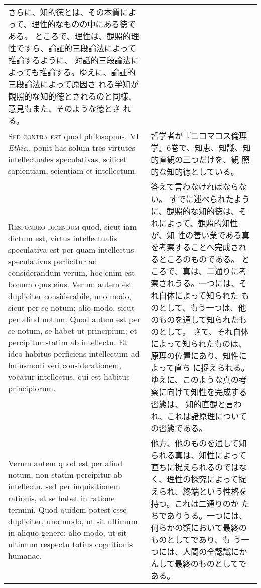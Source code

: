 \documentclass[10pt]{jsarticle} %
\begin{document}
\begin{longtable}{p{21em}p{21em}}
さらに、知的徳とは、その本質によって、理性的なものの中にある徳である。
ところで、理性は、観照的理性ですら、論証的三段論法によって推論するように、
 対話的三段論法によっても推論する。ゆえに、論証的三段論法によって原因さ
 れる学知が観照的な知的徳とされるのと同様、意見もまた、そのような徳とさ
 れる。

\\



{\scshape Sed contra est} quod philosophus, VI
 {\itshape Ethic}., ponit has solum tres virtutes intellectuales speculativas,
 scilicet sapientiam, scientiam et intellectum.

&

哲学者が『ニコマコス倫理学』6巻で、知恵、知識、知的直観の三つだけを、観
 照的な知的徳としている。


\\



{\scshape Respondeo dicendum} quod, sicut iam dictum
 est, virtus intellectualis speculativa est per quam intellectus
 speculativus perficitur ad considerandum verum, hoc enim est bonum opus
 eius. Verum autem est dupliciter considerabile, uno modo, sicut per se
 notum; alio modo, sicut per aliud notum. Quod autem est per se notum,
 se habet ut principium; et percipitur statim ab intellectu. Et ideo
 habitus perficiens intellectum ad huiusmodi veri considerationem,
 vocatur intellectus, qui est habitus principiorum. 

&
答えて言わなければならない。
すでに述べられたように、観照的な知的徳は、それによって、観照的知性が、知
 性の善い業である真を考察することへ完成されるところのものである。
ところで、真は、二通りに考察されうる。一つには、それ自体によって知られた
 ものとして、もう一つは、他のものを通して知られたものとして。
さて、それ自体によって知られたものは、原理の位置にあり、知性によって直ち
 に捉えられる。ゆえに、このような真の考察に向けて知性を完成する習態は、
 知的直観と言われ、これは諸原理についての習態である。


\\



Verum autem quod est
 per aliud notum, non statim percipitur ab intellectu, sed per
 inquisitionem rationis, et se habet in ratione termini. Quod quidem
 potest esse dupliciter, uno modo, ut sit ultimum in aliquo genere; alio
 modo, ut sit ultimum respectu totius cognitionis humanae. 


&

他方、他のものを通して知られる真は、知性によって直ちに捉えられるのではな
 く、理性の探究によって捉えられ、終端という性格を持つ。これは二通りのか
 たちでありうる。一つには、何らかの類において最終のものとしてであり、も
 う一つには、人間の全認識にかんして最終のものとしてである。



\end{longtable}
\end{document}
